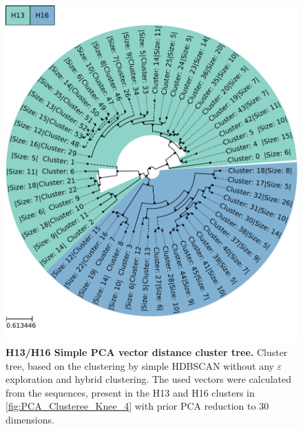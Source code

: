 \begin{figure}[!hbt]
    \centering
    \includegraphics[width=\textwidth]{PCA/Clustertree_Segment_4_H_Simple.pdf}
    \caption[H13/H16 Simple \Acrshort{PCA} vector distance cluster tree]{\textbf{H13/H16 Simple \Acrshort{PCA} vector distance cluster tree.} Cluster tree, based on the clustering by simple \gls{HDBSCAN} without any $\varepsilon$ exploration and hybrid clustering. The used vectors were calculated from the sequences, present in the H13 and H16 clusters in \autoref{fig:PCA_Clusteree_Knee_4} with prior \gls{PCA} reduction to 30 dimensions.}
    \label{fig:Simple_Clustertree_PCA}
\end{figure}

